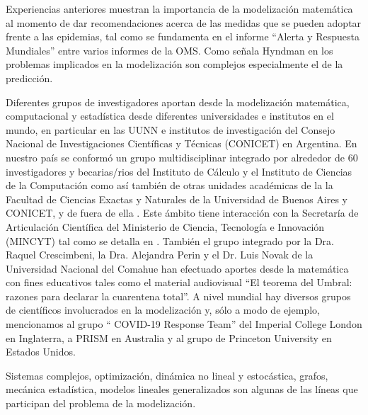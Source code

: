 \documentclass{article}
\begin{document}
Experiencias anteriores muestran la importancia de la modelización matemática al momento de dar recomendaciones acerca de las medidas que se pueden adoptar frente a las epidemias, tal como se fundamenta  en el informe  ``Alerta y Respuesta Mundiales''  \citep{OMS} entre varios informes de la OMS. Como señala Hyndman en \cite{hyn1} los problemas implicados en  la modelización son complejos especialmente el de la predicción. 

  





Diferentes grupos de investigadores aportan desde la modelización matemática,  computacional y estadística desde diferentes universidades e institutos en el mundo, en particular en las UUNN  e institutos de investigación del  Consejo Nacional de Investigaciones Científicas  y Técnicas (CONICET)   en Argentina. En nuestro país se conformó un grupo multidisciplinar integrado por alrededor de 60 investigadores y becarias/rios del Instituto de Cálculo y  el Instituto de Ciencias de la Computación  como así también de otras unidades académicas de la la Facultad de Ciencias Exactas y Naturales de la Universidad de Buenos Aires y CONICET, y  de fuera de ella \cite{coldm}. Este ámbito tiene  interacción con la  Secretaría de Articulación Científica  del Ministerio de Ciencia, Tecnología e Innovación (MINCYT)  tal como se detalla en \cite{icuba}. También el grupo integrado por la Dra. Raquel Crescimbeni, la Dra. Alejandra Perin y el Dr. Luis Novak de la Universidad Nacional del Comahue han efectuado  aportes desde la matemática con fines educativos tales como el material audiovisual ``El teorema del Umbral: razones para declarar la cuarentena total''.  A nivel mundial hay diversos grupos de científicos involucrados en la modelización y, sólo a modo de ejemplo, mencionamos al grupo  `` COVID-19 Response Team'' del Imperial College London \citep{fergu2020} en Inglaterra, a  PRISM \citep{prism} en Australia y al grupo de Princeton University \cite{princet} en Estados Unidos. 
 


 Sistemas complejos, optimización, dinámica no lineal y estocástica, grafos, mecánica estadística, modelos lineales generalizados son algunas de las líneas que participan del problema de la modelización.
\end{document}
